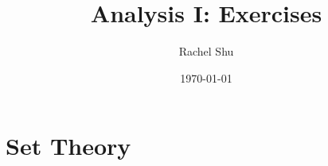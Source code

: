 \documentclass[]{report}
\title{Analysis I: Exercises}
\author{Rachel Shu}
\date{\today}
\newif\ifmainfile
\begin{document}
\mainfiletrue

\maketitle
\tableofcontents

\addtocounter{chapter}{2}
\chapter{Set Theory}

\end{document}
